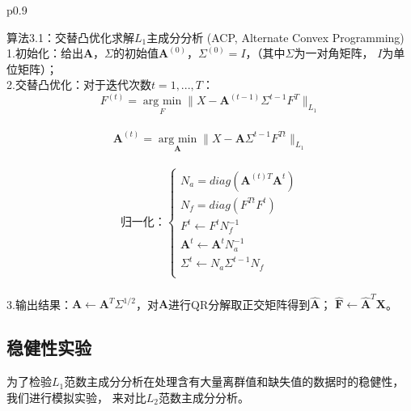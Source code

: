 \begin{table}[H]%
    \centering%
    \begin{tabular}{{p{0.9\columnwidth}}}%
    
    \toprule%
    算法3.1：交替凸优化求解$L_1$主成分分析 (ACP, Alternate Convex Programming) \\
    \midrule%
    1.初始化：给出$\bm{A}$，$\Sigma$的初始值$\bm{A}^{(0)}$，$\Sigma^{(0)} = I$，（其中$\Sigma$为一对角矩阵，
    $I$为单位矩阵）； \\

    2.交替凸优化：对于迭代次数$t = 1, ..., T$： \\
    $$ F^{(t)} = \underset{F}{\operatorname{arg\ min}} \|X - \bm{A}^{(t-1)}\Sigma^{t-1}F^{T}\|_{L_1}$$ \\
    $$ \bm{A}^{(t)} = \underset{\bm{A}}{\operatorname{arg\ min}} \|X - \bm{A}\Sigma^{t-1}F^{Tt} \|_{L_1}$$ \\
    \begin{equation*}
        \text{归一化：}\left\{
                    \begin{array}{clr}
                    N_a = diag(\bm{A}^{(t)T}\bm{A}^{t})\\
                    N_f = diag(F^{Tt}F^{t})\\
                    F^{t} \leftarrow F^{t}N_f^{-1}\\
                    \bm{A}^{t}\leftarrow \bm{A}^{t}N_a^{-1}\\
                    \Sigma^{t} \leftarrow N_a\Sigma^{t-1}N_f\\
                    \end{array}
        \right.
    \end{equation*} \\

    3.输出结果：$\bm{A} \leftarrow \bm{A}^T\Sigma^{1/2}$，对$\bm{A}$进行QR分解取正交矩阵得到$\hat{\bm{A}}$；
    $\hat{\bm{F}} \leftarrow \hat{\bm{A}}^T\bm{X}$。 \\
    \bottomrule%
    \end{tabular}
\end{table}%

\subsection{稳健性实验}\label{lab-1}
为了检验$L_1$范数主成分分析在处理含有大量离群值和缺失值的数据时的稳健性，我们进行模拟实验，
来对比$L_2$范数主成分分析。


